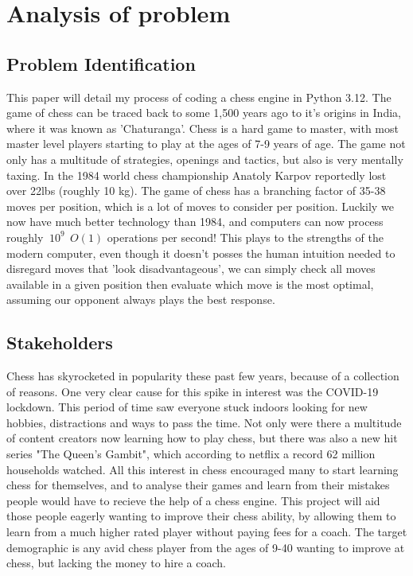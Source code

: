 \section{Analysis of problem}
\subsection{Problem Identification}
This paper will detail my process of coding a chess engine in 
Python 3.12. The game of chess can be traced back to some 1,500
years ago to it's origins in India, where it was known as 
'Chaturanga'. Chess is a hard game to master, with most master
level players starting to play at the ages of 7-9 years of age. 
The game not only has a multitude of strategies, openings and 
tactics, but also is very mentally taxing. In the 1984 world 
chess championship Anatoly Karpov reportedly lost over 22lbs 
(roughly 10 kg). The game of chess has a branching factor of 
35-38 moves per position, which is a lot of moves to consider per
position. Luckily we now have much better technology than 1984, 
and computers can now process roughly $~10^9 \: \: O(1)$
operations per second! This plays to the strengths of the 
modern computer, even though it doesn't posses the human 
intuition needed to disregard moves that 'look disadvantageous', 
we can simply check all moves available in a given position then 
evaluate which move is the most optimal, assuming our opponent 
always plays the best response.


\subsection{Stakeholders}
Chess has skyrocketed in popularity these past few years, because of
a collection of reasons. One very clear cause for this spike in interest
was the COVID-19 lockdown. This period of time saw everyone stuck
indoors looking for new hobbies, distractions and ways to pass
the time. Not only were there a multitude of content creators
now learning how to play chess, but there was also a new hit 
series "The Queen's Gambit", which according to netflix a record
62 million households watched. All this interest in chess encouraged 
many to start learning chess for themselves, and to analyse their 
games and learn from their mistakes people would have to 
recieve the help of a chess engine. This project will aid 
those people eagerly wanting to improve their chess ability, 
by allowing them to learn from a much higher rated player without 
paying fees for a coach. The target demographic is any avid chess player
from the ages of 9-40 wanting to improve at chess, but lacking
the money to hire a coach.
